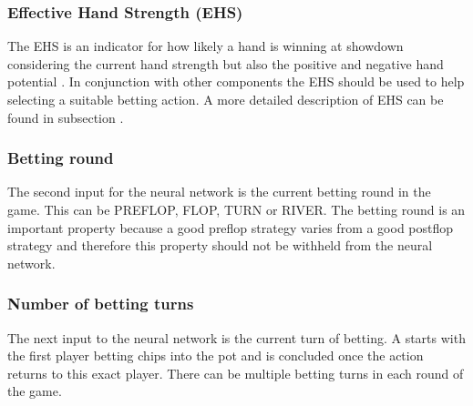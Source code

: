\subsubsection{Effective Hand Strength (EHS)}
The EHS is an indicator for how likely a hand is winning at showdown considering the current hand strength but also the positive and negative hand potential \cite{evolutionary_methods}. In conjunction with other components the EHS should be used to help selecting a suitable betting action. A more detailed description of EHS can be found in subsection .
\subsubsection{Betting round}
The second input for the neural network is the current betting round in the game. This can be PREFLOP, FLOP, TURN or RIVER. The betting round is an important property because a good preflop strategy varies from a good postflop strategy and therefore this property should not be withheld from the neural network.
\subsubsection{Number of betting turns}
The next input to the neural network is the current turn of betting. A  starts with the first player betting chips into the pot and is concluded once the action returns to this exact player. There can be multiple betting turns in each round of the game. 
